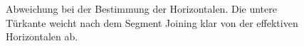 \begin{figure}	
\qquad
{}\qquad
\caption{Abweichung bei der Bestimmung der Horizontalen. Die untere Türkante weicht nach dem Segment Joining klar von der effektiven Horizontalen ab.}%
\label{fig:door-joining-error}
\end{figure}